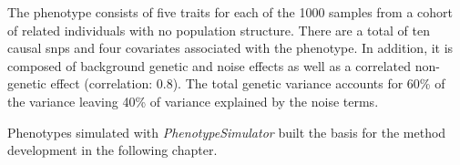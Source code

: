 The phenotype consists of five traits for each of the \num{1000} samples from a cohort of related individuals with no population structure. There are a total of ten causal \glspl{snp} and four covariates associated with the phenotype. In addition, it is composed of background genetic and noise effects as well as a correlated non-genetic effect (correlation: \num{0.8}). The total genetic variance accounts for \num{60}\% of the variance leaving \num{40}\% of variance explained by the noise terms.

Phenotypes simulated with \textit{PhenotypeSimulator} built the basis for the method development in the following chapter.